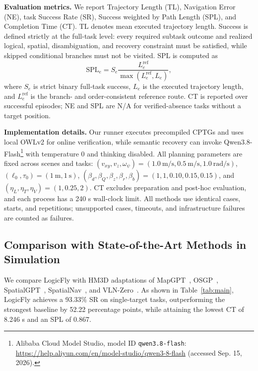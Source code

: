 \documentclass[letterpaper,10pt,conference]{ieeeconf}
\begin{document}
\textbf{Evaluation metrics.}
We report Trajectory Length (TL), Navigation Error (NE), task Success Rate (SR), Success weighted by Path Length (SPL), and Completion Time (CT). TL denotes mean executed trajectory length. Success is defined strictly at the full-task level: every required subtask outcome and realized logical, spatial, disambiguation, and recovery constraint must be satisfied, while skipped conditional branches must not be visited. SPL is computed as
\begin{equation}
\mathrm{SPL}_e=S_e\frac{L_e^{\mathrm{ref}}}
{\max(L_e^{\mathrm{ref}},L_e)},
\end{equation}
where $S_e$ is strict binary full-task success, $L_e$ is the executed trajectory length, and $L_e^{\mathrm{ref}}$ is the branch- and order-consistent reference route. CT is reported over successful episodes; NE and SPL are N/A for verified-absence tasks without a target position.

\textbf{Implementation details.}
Our runner executes precompiled CPTGs and uses local OWLv2 for online verification, while semantic recovery can invoke Qwen3.8-Flash\footnote{Alibaba Cloud Model Studio, model ID \texttt{qwen3.8-flash}: \url{https://help.aliyun.com/en/model-studio/qwen3-8-flash} (accessed Sep. 15, 2026).} with temperature 0 and thinking disabled. All planning parameters are fixed across scenes and tasks: $(v_{xy},v_z,\omega_\psi)=(1.0~\mathrm{m/s},0.5~\mathrm{m/s},1.0~\mathrm{rad/s})$, $(\ell_0,\tau_0)=(1~\mathrm{m},1~\mathrm{s})$, $(\beta_d,\beta_Q,\beta_z,\beta_r,\beta_b)=(1,1,0.10,0.15,0.15)$, and $(\eta_L,\eta_T,\eta_V)=(1,0.25,2)$. CT excludes preparation and post-hoc evaluation, and each process has a 240 s wall-clock limit. All methods use identical cases, starts, and repetitions; unsupported cases, timeouts, and infrastructure failures are counted as failures.

\subsection{Comparison with State-of-the-Art Methods in Simulation}
We compare LogicFly with HM3D adaptations of MapGPT~\cite{chen2024mapgpt}, OSGP~\cite{dai2024osgp}, SpatialGPT~\cite{jiang2025spatialgpt}, SpatialNav~\cite{zhang2026spatialnav}, and VLN-Zero~\cite{bhatt2025vlnzero}. As shown in Table~\ref{tab:main}, LogicFly achieves a 93.33\% SR on single-target tasks, outperforming the strongest baseline by 52.22 percentage points, while attaining the lowest CT of 8.246 s and an SPL of 0.867.
\end{document}
